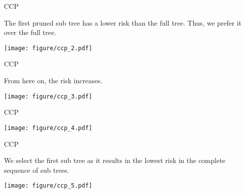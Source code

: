 \documentclass[11pt,compress,t,notes=noshow, xcolor=table]{beamer}
\begin{document}
\begin{frame}[noframenumbering]{CCP}


The first pruned sub tree has a lower risk than the full tree.
Thus, we prefer it over the full tree.
\vspace{0.25cm}

{\centering \texttt{[image: figure/ccp\_2.pdf]} 

}

\end{frame}

\begin{frame}[noframenumbering]{CCP}

From here on, the risk increases.
\vspace{0.25cm}


{\centering \texttt{[image: figure/ccp\_3.pdf]} 

}

\end{frame}

\begin{frame}[noframenumbering]{CCP}


{\centering \texttt{[image: figure/ccp\_4.pdf]} 

}


\end{frame}

\begin{frame}[noframenumbering]{CCP}

We select the first sub tree as it results in the lowest risk in the complete sequence of sub trees.
\vspace{0.25cm}


{\centering \texttt{[image: figure/ccp\_5.pdf]} 

}


\end{frame}



\endlecture
\end{document}
